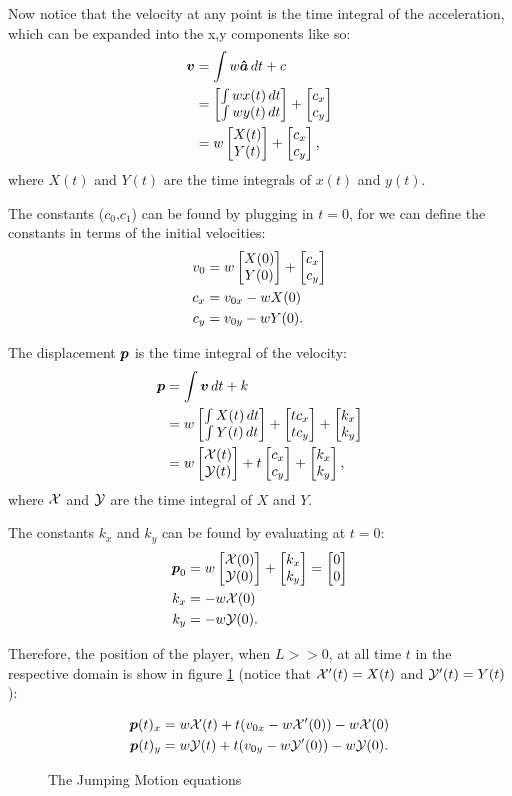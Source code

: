Now notice that the velocity at any point is the time integral of the acceleration, which can be expanded into the x,y components like so:
\begin{align*}
    \boldsymbol{v} &= \int w\boldsymbol{\hat{a}} \,dt + c\\
    &= \begin{bmatrix}\int w x(t) \,dt\\ \int w y(t) \,dt \end{bmatrix} + \begin{bmatrix}c_x\\c_y \end{bmatrix}\\
    &= w\begin{bmatrix}X(t)\\Y(t) \end{bmatrix} + \begin{bmatrix}c_x\\c_y \end{bmatrix},
\end{align*}
where $X(t)$ and $Y(t)$ are the time integrals of $x(t)$ and $y(t)$.

The constants ($c_0$,$c_1$) can be found by plugging in $t=0$, for we can define the constants in terms of the initial velocities:
\begin{align*}
    v_0 &= w \begin{bmatrix}X(0)\\Y(0) \end{bmatrix} + \begin{bmatrix}c_x\\c_y \end{bmatrix}\\
    c_x &= v_{0x} -wX(0)\\
    c_y &= v_{0y} -wY(0).
\end{align*}

The displacement $\boldsymbol{p}$ is the time integral of the velocity:
\begin{align*}
    \boldsymbol{p} &= \int \boldsymbol{v} \, dt + k\\
    &= w \begin{bmatrix}\int X(t) \, dt\\\int Y(t) \, dt \end{bmatrix} + \begin{bmatrix}tc_x\\tc_y \end{bmatrix} + \begin{bmatrix}k_x\\k_y \end{bmatrix}\\
    &= w \begin{bmatrix}\mathcal{X}(t)\\\mathcal{Y}(t) \end{bmatrix}  + t\begin{bmatrix}c_x\\c_y \end{bmatrix}  + \begin{bmatrix}k_x\\k_y \end{bmatrix},
\end{align*}
where $\mathcal{X}$ and $\mathcal{Y}$ are the time integral of $X$ and $Y$.

The constants $k_x$ and $k_y$ can be found by evaluating at $t=0$:
\begin{align*}
    \boldsymbol{p}_0 &= w \begin{bmatrix}\mathcal{X}(0)\\\mathcal{Y}(0) \end{bmatrix} + \begin{bmatrix}k_x\\k_y \end{bmatrix} = \begin{bmatrix}0\\0 \end{bmatrix}\\
    k_x &= -w\mathcal{X}(0)\\
    k_y &= -w\mathcal{Y}(0).
\end{align*}

Therefore, the position of the player, when $L >> 0$, at all time $t$ in the respective domain is show in figure \ref{eq:jumping} (notice that $\mathcal{X}'(t) = X(t)$ and $\mathcal{Y}'(t) = Y(t)$):

\begin{figure}[H]
    \centering
    \begin{align*}
        \boldsymbol{p}(t)_x &= w\mathcal{X}(t) + t(v_{0x} - w\mathcal{X}'(0)) - w\mathcal{X}(0)\\
        \boldsymbol{p}(t)_y &= w\mathcal{Y}(t) + t(v_{0y} - w\mathcal{Y}'(0)) - w\mathcal{Y}(0).
    \end{align*}
    \caption{The Jumping Motion equations}
    \label{eq:jumping}
\end{figure}


